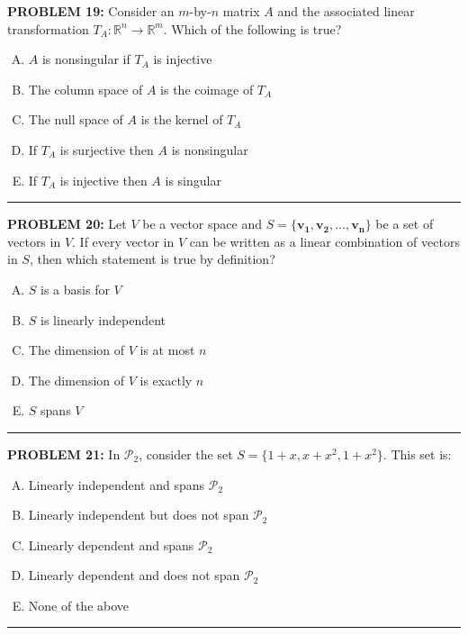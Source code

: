 \documentclass[12pt]{amsart}
\newcommand{\divider}{
  \vspace{-1em} %
  \noindent
  \raisebox{-0.15ex}{\textbullet}%
  \hspace{0.5em}%
  \rule[0.5ex]{0.95\textwidth}{1.0pt}%
  \hspace{0.5em}%
  \raisebox{-0.15ex}{\textbullet}%
  \vspace{0em} %
}
\begin{document}
{\bf PROBLEM 19:}
Consider an $m$-by-$n$ matrix $A$ and the associated linear transformation $T_A:\mathbb{R}^n\to\mathbb{R}^m$. Which of the following is true? 

\begin{enumerate}[(A)]
\item $A$ is nonsingular if $T_A$ is injective
\item The column space of $A$ is the coimage of $T_A$
\item The null space of $A$ is the kernel of $T_A$
\item If $T_A$ is surjective then $A$ is nonsingular
\item If $T_A$ is injective then $A$ is singular 
\end{enumerate}
\divider


{\bf PROBLEM 20:}
Let $V$ be a vector space and $S = \{\mathbf{v_1, v_2, ..., v_n}\}$ be a set of vectors in $V$. If every vector in $V$ can be written as a linear combination of vectors in $S$, then which statement is true by definition?

\begin{enumerate}[(A)]
\item $S$ is a basis for $V$
\item $S$ is linearly independent
\item The dimension of $V$ is at most $n$ 
\item The dimension of $V$ is exactly $n$
\item $S$ spans $V$
\end{enumerate}
\divider


{\bf PROBLEM 21:}
In $\mathcal{P}_2$, consider the set $S = \{1+x, x+x^2, 1+x^2\}$. This set is:
\begin{enumerate}[(A)]
\item Linearly independent and spans $\mathcal{P}_2$
\item Linearly independent but does not span $\mathcal{P}_2$
\item Linearly dependent and spans $\mathcal{P}_2$
\item Linearly dependent and does not span $\mathcal{P}_2$
\item None of the above
\end{enumerate}
\divider
\end{document}
